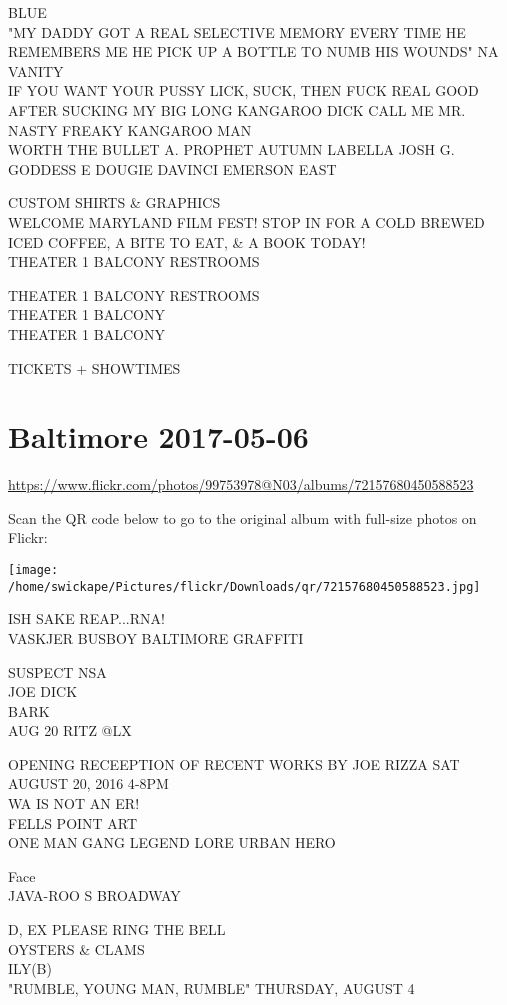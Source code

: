 \documentclass[10pt,letterpaper]{article}
\begin{document}
BLUE\\
"MY DADDY GOT A REAL SELECTIVE MEMORY EVERY TIME HE REMEMBERS ME HE PICK UP A BOTTLE TO NUMB HIS WOUNDS" NA VANITY\\
IF YOU WANT YOUR PUSSY LICK, SUCK, THEN FUCK REAL GOOD AFTER SUCKING MY BIG LONG KANGAROO DICK CALL ME MR. NASTY FREAKY KANGAROO MAN\\
WORTH THE BULLET A. PROPHET AUTUMN LABELLA JOSH G. GODDESS E DOUGIE DAVINCI EMERSON EAST

CUSTOM SHIRTS \& GRAPHICS\\
WELCOME MARYLAND FILM FEST!  STOP IN FOR A COLD BREWED ICED COFFEE, A BITE TO EAT, \& A BOOK TODAY!\\
THEATER 1 BALCONY RESTROOMS

THEATER 1 BALCONY RESTROOMS\\
THEATER 1 BALCONY\\
THEATER 1 BALCONY

TICKETS + SHOWTIMES


\section*{Baltimore 2017-05-06}

\url{https://www.flickr.com/photos/99753978@N03/albums/72157680450588523}

Scan the QR code below to go to the original album with full-size photos on Flickr:

\texttt{[image: /home/swickape/Pictures/flickr/Downloads/qr/72157680450588523.jpg]}


ISH SAKE REAP...RNA!\\
VASKJER BUSBOY BALTIMORE GRAFFITI

SUSPECT NSA\\
JOE DICK\\
BARK\\
AUG 20 RITZ @LX

OPENING RECEEPTION OF RECENT WORKS BY JOE RIZZA SAT AUGUST 20, 2016 4{-}8PM\\
WA IS NOT AN ER!\\
FELLS POINT ART\\
ONE MAN GANG LEGEND LORE URBAN HERO

Face\\
JAVA{-}ROO S BROADWAY

D, EX PLEASE RING THE BELL\\
OYSTERS \& CLAMS\\
ILY(B)\\
"RUMBLE, YOUNG MAN, RUMBLE" THURSDAY, AUGUST 4
\end{document}
